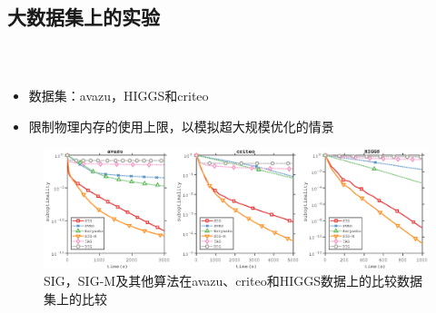 {    \begin{overlayarea}{11.5cm}{4cm}
    {
    }
    \end{overlayarea}
  }

  \subsection{大数据集上的实验}

  \frame
  {
    \frametitle{\subsecname~ }
    \footnotesize
    \begin{itemize}
        \item 数据集：avazu，HIGGS和criteo
        \item 限制物理内存的使用上限，以模拟超大规模优化的情景
    \end{itemize}

    \begin{figure}
        \includegraphics[trim={3.5cm 0cm 3.5cm 0cm},clip,width=11.5cm]{data/img/figure4}
        \caption{SIG，SIG-M及其他算法在avazu、criteo和HIGGS数据上的比较数据集上的比较}
    \end{figure}

  }

